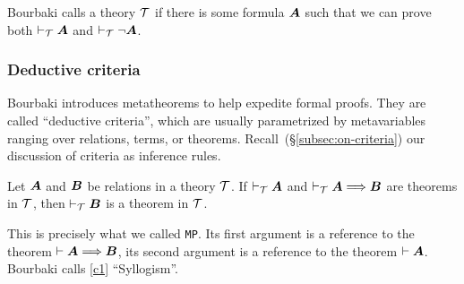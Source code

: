 \begin{definition}\label{defn:contradictory-theory}
Bourbaki calls a theory $\mathcal{T}$  if there is
some formula $\boldsymbol{A}$ such that we can prove both
$\vdash_{\mathcal{T}}\boldsymbol{A}$ and $\vdash_{\mathcal{T}}\neg\boldsymbol{A}$.
\end{definition}

\subsubsection{Deductive criteria}
Bourbaki introduces metatheorems to help expedite formal proofs. They
are called ``deductive criteria'', which are usually parametrized by
metavariables ranging over relations, terms, or
theorems. Recall~(\S\ref{subsec:on-criteria}) our discussion of criteria
as inference rules.

\begin{dc}\label{c1}%
Let $\boldsymbol{A}$ and $\boldsymbol{B}$ be relations in a theory
$\mathcal{T}$. If $\vdash_{\mathcal{T}}\boldsymbol{A}$ and
$\vdash_{\mathcal{T}}\boldsymbol{A}\Longrightarrow\boldsymbol{B}$ are
theorems in $\mathcal{T}$, then $\vdash_{\mathcal{T}}\boldsymbol{B}$ is
a theorem in $\mathcal{T}$.
\end{dc}

\begin{remark*}
This is precisely what we called \texttt{MP}. Its first argument is a
reference to the theorem $\vdash\boldsymbol{A}\Longrightarrow\boldsymbol{B}$,
its second argument is a reference to the theorem $\vdash\boldsymbol{A}$.
Bourbaki calls \ref{c1} ``Syllogism''.
\end{remark*}
